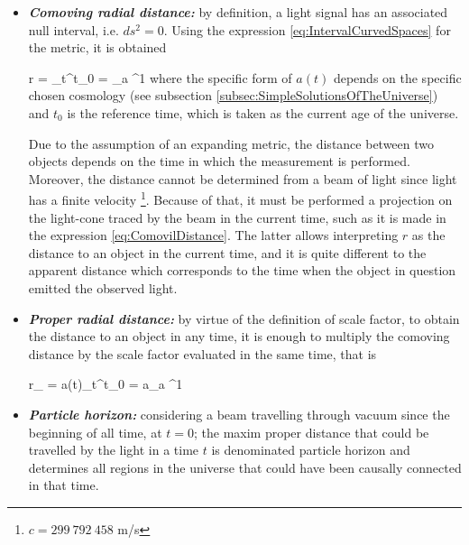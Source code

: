 \begin{itemize}
\item \textit{\textbf{Comoving radial distance:}} by definition, a light
signal has an associated null interval, i.e. $ds^2 = 0$. Using the 
expression \ref{eq:IntervalCurvedSpaces} for the metric, it is obtained


{ r = \int_t^{t_0}  = \int_a ^1  }
where the specific form of $a(t)$ depends on the specific chosen cosmology
(see subsection \ref{subsec:SimpleSolutionsOfTheUniverse}) and $t_0$ is the
reference time, which is taken as the current age of the universe.


Due to the assumption of an expanding metric, the distance between two 
objects depends on the time in which the measurement is performed. 
Moreover, the distance cannot be determined from a beam of light since
light has a finite velocity \footnote{$c=299\ 792\ 458$ m/s}. Because of 
that, it must be performed a projection on the light-cone traced by the 
beam in the current time, such as it is made in the expression 
\ref{eq:ComovilDistance}. The latter allows interpreting $r$ as the 
distance to an object in the current time, and it is quite different to
the apparent distance which corresponds to the time when the object in 
question emitted the observed light.


\item \textit{\textbf{Proper radial distance:}} by virtue of the 
definition of scale factor, to obtain the distance to an object in any 
time, it is enough to multiply the comoving distance by the scale factor 
evaluated in the same time, that is



{ r_{} = a(t)\int_t^{t_0}  = 
a\int_a ^1  }


\item \textit{\textbf{Particle horizon:}} considering a beam travelling 
through vacuum since the beginning of all time, at $t=0$; the maxim proper
distance that could be travelled by the light in a time $t$ is denominated 
particle horizon and determines all regions in the universe that could 
have been causally connected in that time. 




\end{itemize}
